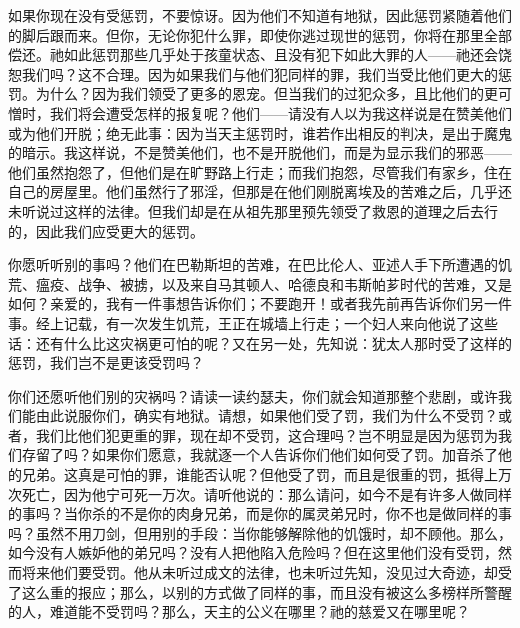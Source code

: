 如果你现在没有受惩罚，不要惊讶。因为他们不知道有地狱，因此惩罚紧随着他们的脚后跟而来。但你，无论你犯什么罪，即使你逃过现世的惩罚，你将在那里全部偿还。祂如此惩罚那些几乎处于孩童状态、且没有犯下如此大罪的人——祂还会饶恕我们吗？这不合理。因为如果我们与他们犯同样的罪，我们当受比他们更大的惩罚。为什么？因为我们领受了更多的恩宠。但当我们的过犯众多，且比他们的更可憎时，我们将会遭受怎样的报复呢？他们——请没有人以为我这样说是在赞美他们或为他们开脱；绝无此事：因为当天主惩罚时，谁若作出相反的判决，是出于魔鬼的暗示。我这样说，不是赞美他们，也不是开脱他们，而是为显示我们的邪恶——他们虽然抱怨了，但他们是在旷野路上行走；而我们抱怨，尽管我们有家乡，住在自己的房屋里。他们虽然行了邪淫，但那是在他们刚脱离埃及的苦难之后，几乎还未听说过这样的法律。但我们却是在从祖先那里预先领受了救恩的道理之后去行的，因此我们应受更大的惩罚。\par

你愿听听别的事吗？他们在巴勒斯坦的苦难，在巴比伦人、亚述人手下所遭遇的饥荒、瘟疫、战争、被掳，以及来自马其顿人、哈德良和韦斯帕芗时代的苦难，又是如何？亲爱的，我有一件事想告诉你们；不要跑开！或者我先前再告诉你们另一件事。经上记载，有一次发生饥荒，王正在城墙上行走；一个妇人来向他说了这些话：还有什么比这灾祸更可怕的呢？又在另一处，先知说：犹太人那时受了这样的惩罚，我们岂不是更该受罚吗？\par

你们还愿听他们别的灾祸吗？请读一读约瑟夫，你们就会知道那整个悲剧，或许我们能由此说服你们，确实有地狱。请想，如果他们受了罚，我们为什么不受罚？或者，我们比他们犯更重的罪，现在却不受罚，这合理吗？岂不明显是因为惩罚为我们存留了吗？如果你们愿意，我就逐一个人告诉你们他们如何受了罚。加音杀了他的兄弟。这真是可怕的罪，谁能否认呢？但他受了罚，而且是很重的罚，抵得上万次死亡，因为他宁可死一万次。请听他说的：那么请问，如今不是有许多人做同样的事吗？当你杀的不是你的肉身兄弟，而是你的属灵弟兄时，你不也是做同样的事吗？虽然不用刀剑，但用别的手段：当你能够解除他的饥饿时，却不顾他。那么，如今没有人嫉妒他的弟兄吗？没有人把他陷入危险吗？但在这里他们没有受罚，然而将来他们要受罚。他从未听过成文的法律，也未听过先知，没见过大奇迹，却受了这么重的报应；那么，以别的方式做了同样的事，而且没有被这么多榜样所警醒的人，难道能不受罚吗？那么，天主的公义在哪里？祂的慈爱又在哪里呢？\par

